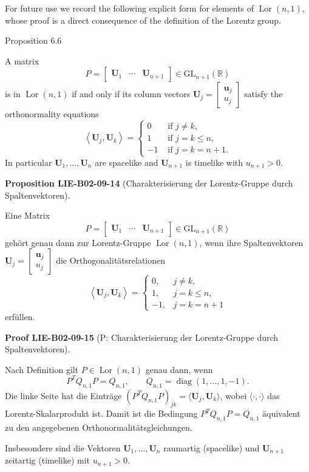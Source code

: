 \documentclass[10pt, letterpaper]{article}
\newcommand{\CustomHeading}[3]{%
  \par\medskip\noindent%
  \textbf{#1 #2} \textnormal{(#3)}.\enskip%
}
\newenvironment{PROP}[2]{\begin{unitbox}\CustomHeading{Proposition}{#1}{#2}}{\end{unitbox}}
\newenvironment{PROOF}[2]{\begin{unitbox}\CustomHeading{Proof}{#1}{#2}}{\end{unitbox}}
\begin{document}
For future use we record the following explicit form for elements of $\operatorname{Lor}(n, 1)$, whose proof is a direct consequence of the definition of the Lorentz group.

Proposition 6.6


A matrix
$$
P=\left[\begin{array}{lll}
\mathbf{U}_{1} & \cdots & \mathbf{U}_{n+1}
\end{array}\right] \in \mathrm{GL}_{n+1}(\mathbb{R})
$$
is in $\operatorname{Lor}(n, 1)$ if and only if its column vectors $\mathbf{U}_{j}=\left[\begin{array}{l}\mathbf{u}_{j} \\ u_{j}\end{array}\right]$ satisfy the orthonormality equations
$$
\left\langle\mathbf{U}_{j}, \mathbf{U}_{k}\right\rangle=\left\{\begin{aligned}
0 & \text { if } j \neq k, \\
1 & \text { if } j=k \leqslant n, \\
-1 & \text { if } j=k=n+1 .
\end{aligned}\right.
$$
In particular $\mathbf{U}_{1}, \ldots, \mathbf{U}_{n}$ are spacelike and $\mathbf{U}_{n+1}$ is timelike with $u_{n+1}>0$.


\begin{PROP}{LIE-B02-09-14}{Charakterisierung der Lorentz-Gruppe durch Spaltenvektoren}
Eine Matrix
\[
P=
\begin{bmatrix}
\mathbf{U}_{1} & \cdots & \mathbf{U}_{n+1}
\end{bmatrix}
\in \mathrm{GL}_{n+1}(\mathbb{R})
\]
gehört genau dann zur Lorentz-Gruppe
\(\operatorname{Lor}(n,1)\),
wenn ihre Spaltenvektoren
\(\mathbf{U}_{j}=
\begin{bmatrix}
\mathbf{u}_{j}\\[2pt]
u_{j}
\end{bmatrix}\)
die Orthogonalitätsrelationen
\[
\left\langle \mathbf{U}_{j}, \mathbf{U}_{k} \right\rangle
=
\begin{cases}
0, & j\neq k,\\[4pt]
1, & j=k\leq n,\\[4pt]
-1, & j=k=n+1
\end{cases}
\]
erfüllen.
\end{PROP}


\begin{PROOF}{LIE-B02-09-15}{P: Charakterisierung der Lorentz-Gruppe durch Spaltenvektoren}
Nach Definition gilt \(P\in \operatorname{Lor}(n,1)\) genau dann, wenn
\[
P^{T} Q_{n,1} P = Q_{n,1}, 
\qquad Q_{n,1}=\operatorname{diag}(1,\ldots,1,-1).
\]
Die linke Seite hat die Einträge
\((P^{T} Q_{n,1} P)_{jk} = \langle \mathbf{U}_{j}, \mathbf{U}_{k} \rangle\),
wobei \(\langle\cdot,\cdot\rangle\) das Lorentz-Skalarprodukt ist.
Damit ist die Bedingung \(P^{T} Q_{n,1} P = Q_{n,1}\) äquivalent zu den angegebenen
Orthonormalitätsgleichungen.

Insbesondere sind die Vektoren \(\mathbf{U}_{1},\ldots,\mathbf{U}_{n}\)
raumartig (spacelike) und \(\mathbf{U}_{n+1}\)
zeitartig (timelike) mit \(u_{n+1}>0\).
\end{PROOF}
\end{document}
